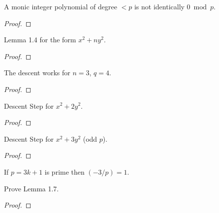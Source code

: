 \begin{theorem}[Exercise 1.2(c)]
  \label{exr:s1_2_c}
  \leanok
  A monic integer polynomial of degree $< p$ is not identically $0 \bmod p$.
\end{theorem}
\begin{proof}\end{proof}

\begin{theorem}[Exercise 1.3(a)]
  \label{exr:s1_3_a}
  \leanok
  Lemma 1.4 for the form $x^2+ny^2$.
\end{theorem}
\begin{proof}\end{proof}

\begin{theorem}[Exercise 1.3(b)]
  \label{exr:s1_3_b}
  \leanok
  The descent works for $n=3$, $q=4$.
\end{theorem}
\begin{proof}\end{proof}

\begin{theorem}[Exercise 1.4(a)]
  \label{exr:s1_4_a}
  \leanok
  Descent Step for $x^2+2y^2$.
\end{theorem}
\begin{proof}\end{proof}

\begin{theorem}[Exercise 1.4(b)]
  \label{exr:s1_4_b}
  \leanok
  Descent Step for $x^2+3y^2$ (odd $p$).
\end{theorem}
\begin{proof}\end{proof}

\begin{theorem}[Exercise 1.5]
  \label{exr:s1_5}
  \leanok
  If $p = 3k+1$ is prime then $(-3/p) = 1$.
\end{theorem}

\begin{theorem}[Exercise 1.6]
  \label{exr:s1_6}
  \leanok
  Prove Lemma 1.7.
\end{theorem}
\begin{proof}\end{proof}

